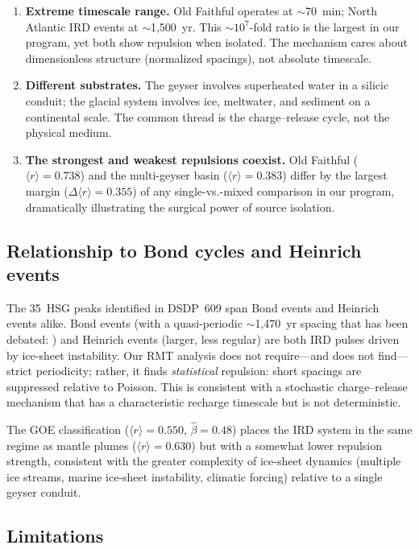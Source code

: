 \documentclass[12pt,a4paper]{article}
\begin{document}
\begin{enumerate}
\item \textbf{Extreme timescale range.} Old Faithful operates at $\sim$70~min; North Atlantic IRD events at $\sim$1,500~yr. This $\sim$$10^7$-fold ratio is the largest in our program, yet both show repulsion when isolated. The mechanism cares about dimensionless structure (normalized spacings), not absolute timescale.
\item \textbf{Different substrates.} The geyser involves superheated water in a silicic conduit; the glacial system involves ice, meltwater, and sediment on a continental scale. The common thread is the charge--release cycle, not the physical medium.
\item \textbf{The strongest and weakest repulsions coexist.} Old Faithful ($\langle r\rangle=0.738$) and the multi-geyser basin ($\langle r\rangle=0.383$) differ by the largest margin ($\Delta\langle r\rangle=0.355$) of any single-vs.-mixed comparison in our program, dramatically illustrating the surgical power of source isolation.
\end{enumerate}

\subsection{Relationship to Bond cycles and Heinrich events}

The 35~HSG peaks identified in DSDP~609 span Bond events and Heinrich events alike. Bond events (with a quasi-periodic $\sim$1,470~yr spacing that has been debated: \citealp{obrochta2012}) and Heinrich events (larger, less regular) are both IRD pulses driven by ice-sheet instability. Our RMT analysis does not require---and does not find---strict periodicity; rather, it finds \emph{statistical} repulsion: short spacings are suppressed relative to Poisson. This is consistent with a stochastic charge--release mechanism that has a characteristic recharge timescale but is not deterministic.

The GOE classification ($\langle r\rangle=0.550$, $\hat\beta=0.48$) places the IRD system in the same regime as mantle plumes ($\langle r\rangle=0.630$) but with a somewhat lower repulsion strength, consistent with the greater complexity of ice-sheet dynamics (multiple ice streams, marine ice-sheet instability, climatic forcing) relative to a single geyser conduit.

\subsection{Limitations}
\end{document}
